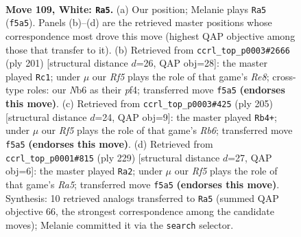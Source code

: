 \documentclass[11pt]{article}
\begin{document}
\clearpage

\begin{figure}[p]\centering
\begin{subfigure}{0.46\textwidth}\centering
\resizebox{\linewidth}{!}{%
\newchessgame
\chessboard[
  setfen={8/6p1/1N3pk1/5R1p/7P/6PK/4r3/8 w - - 42 109},
  showmover=false,
  pgfstyle=straightmove, color=movearrow, markmove={f5-a5}
]}
\caption{}
\end{subfigure}\hfill
\begin{subfigure}{0.46\textwidth}\centering
\resizebox{\linewidth}{!}{%
\newchessgame
\chessboard[
  setfen={3R4/6k1/4p1p1/4P2p/5P1P/6P1/5K2/4r3 b - - 54 101},
  showmover=false,
  pgfstyle=straightmove, color=movearrow, markmove={e1-c1}
]}
\caption{}
\end{subfigure}
\\[4pt]
\begin{subfigure}{0.46\textwidth}\centering
\resizebox{\linewidth}{!}{%
\newchessgame
\chessboard[
  setfen={8/5pk1/R6p/5P2/5KP1/1r3P2/8/8 b - - 92 103},
  showmover=false,
  pgfstyle=straightmove, color=movearrow, markmove={b3-b4}
]}
\caption{}
\end{subfigure}\hfill
\begin{subfigure}{0.46\textwidth}\centering
\resizebox{\linewidth}{!}{%
\newchessgame
\chessboard[
  setfen={8/5pk1/5p2/3R3P/r5P1/5PK1/8/8 b - - 64 115},
  showmover=false,
  pgfstyle=straightmove, color=movearrow, markmove={a4-a2}
]}
\caption{}
\end{subfigure}
\caption{\textbf{Move 109, White: \texttt{Ra5}.} (a) Our position; Melanie plays \texttt{Ra5} (\texttt{f5a5}). Panels (b)--(d) are the retrieved master positions whose correspondence most drove this move (highest QAP objective among those that transfer to it). (b) Retrieved from \texttt{ccrl\_top\_p0003\#2666} (ply 201) [structural distance $d$=26, QAP obj=28]: the master played \texttt{Rc1}; under $\mu$ our \emph{Rf5} plays the role of that game's \emph{Re8}; cross-type roles: our \emph{N}b6 as their \emph{p}f4; transferred move \texttt{f5a5} \textbf{(endorses this move)}. (c) Retrieved from \texttt{ccrl\_top\_p0003\#425} (ply 205) [structural distance $d$=24, QAP obj=9]: the master played \texttt{Rb4+}; under $\mu$ our \emph{Rf5} plays the role of that game's \emph{Rb6}; transferred move \texttt{f5a5} \textbf{(endorses this move)}. (d) Retrieved from \texttt{ccrl\_top\_p0001\#815} (ply 229) [structural distance $d$=27, QAP obj=6]: the master played \texttt{Ra2}; under $\mu$ our \emph{Rf5} plays the role of that game's \emph{Ra5}; transferred move \texttt{f5a5} \textbf{(endorses this move)}. Synthesis: 10 retrieved analogs transferred to \texttt{Ra5} (summed QAP objective 66, the strongest correspondence among the candidate moves); Melanie committed it via the \texttt{search} selector.}
\label{fig:thought-m216}
\end{figure}
\end{document}
